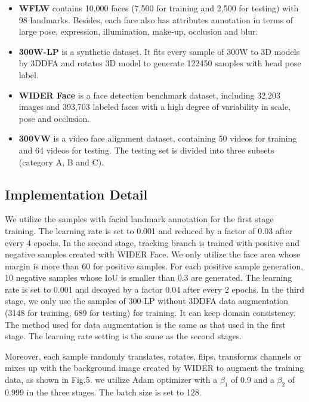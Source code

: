 \documentclass[3p,twocolumn, round, sort & compress]{elsarticle}
\begin{document}
\begin{itemize} 
	\item \textbf{WFLW} \citep{LAB} contains 10,000 faces (7,500 for training and 2,500 for testing) with 98 landmarks. Besides, each face also has attributes annotation in terms of large pose, expression, illumination, make-up, occlusion and blur.
	\item \textbf{300W-LP} \citep{3DDFA} is a synthetic dataset. It fits every sample of 300W \citep{300W} to 3D models by 3DDFA \citep{3DDFA} and rotates 3D model to generate 122450 samples with head pose label.
	\item \textbf{WIDER Face} \citep{WIDER} is a face detection benchmark dataset, including 32,203 images and 393,703 labeled faces with a high degree of variability in scale, pose and occlusion.
	\item \textbf{300VW} \citep{300VW} is a video face alignment dataset, containing 50 videos for training and 64 videos for testing. The testing set is divided into three subsets (category A, B and C).
\end{itemize}

\subsection{Implementation Detail}
We utilize the samples with facial landmark annotation for the first stage training. The learning rate is set to 0.001 and reduced by a factor of 0.03 after every 4 epochs. In the second stage, tracking branch is trained with positive and negative samples created with WIDER Face. We only utilize the face area whose margin is more than 60 for positive samples. For each positive sample generation, 10 negative samples whose IoU is smaller than 0.3 are generated. The learning rate is set to 0.001 and decayed by a factor 0.04 after every 2 epochs. In the third stage, we only use the samples of 300-LP without 3DDFA \citep{3DDFA} data augmentation (3148 for training, 689 for testing) for training. It can keep domain consistency. The method used for data augmentation is the same as that used in the first stage. The learning rate setting is the same as the second stages.

Moreover, each sample randomly translates, rotates, flips, transforms channels or mixes up with the background image created by WIDER to augment the training data, as shown in Fig.5. we utilize Adam \citep{Adam} optimizer with a $\beta_1$ of 0.9 and a $\beta_2$ of 0.999 in the three stages. The batch size is set to 128.
\end{document}
